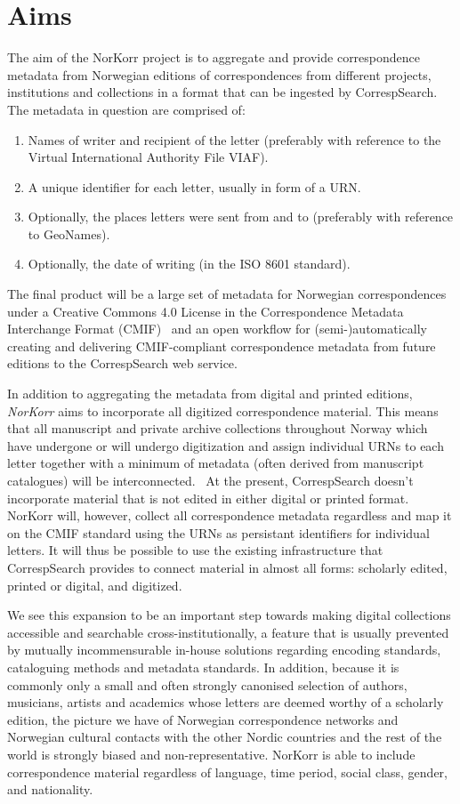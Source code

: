 \documentclass[runningheads]{llncs}
\begin{document}
\section{Aims}
The aim of the NorKorr project is to aggregate and provide
correspondence metadata from Norwegian editions of correspondences from
different projects, institutions and collections in a format that can be
ingested by CorrespSearch. The metadata in question are comprised of:
\begin{enumerate}
\item Names of writer and recipient of the letter (preferably with reference to
the Virtual International Authority File
VIAF).~\cite{ref_url3} 
\item A unique identifier for each
letter, usually in form of a URN. 
\item Optionally, the places letters
were sent from and to (preferably with reference to
GeoNames).~\cite{ref_url4} 
\item Optionally, the date of
writing (in the ISO 8601 standard).~\cite{ref_url5}
\end{enumerate}
The final
product will be a large set of metadata for Norwegian correspondences
under a Creative Commons 4.0 License in the 
Correspondence
Metadata Interchange Format (CMIF)~\cite{ref_url10} and an open workflow for
(semi-)automatically creating and delivering CMIF-compliant
correspondence metadata from future editions to the
CorrespSearch web service.

In addition to aggregating the metadata from digital and printed editions, \textit{NorKorr} aims to incorporate all digitized
correspondence material. This means that all manuscript and private
archive collections throughout Norway which have undergone or will
undergo digitization and assign individual URNs to each letter together
with a minimum of metadata (often derived from manuscript catalogues)
will be interconnected.~\cite{ref_proc} At the
present, CorrespSearch doesn't incorporate material that is not edited in either digital or printed format. NorKorr will,
however, collect all correspondence metadata regardless and map it on
the CMIF standard using the URNs as persistant identifiers for
individual letters. It will thus be possible to use the existing
infrastructure that CorrespSearch provides to connect material in almost
all forms: scholarly edited, printed or digital, and digitized.

We see this expansion to be an important step towards making digital
collections accessible and searchable cross-institutionally, a feature
that is usually prevented by mutually incommensurable in-house
solutions regarding encoding standards, cataloguing methods and metadata
standards. In addition, because it is commonly only a small and often
strongly canonised selection of authors, musicians, artists and
academics whose letters are deemed worthy of a scholarly edition, the
picture we have of Norwegian correspondence networks and Norwegian
cultural contacts with the other Nordic countries and the rest of the
world is strongly biased and non-representative. NorKorr is able to
include correspondence material regardless of language, time period,
social class, gender, and nationality.
\end{document}
